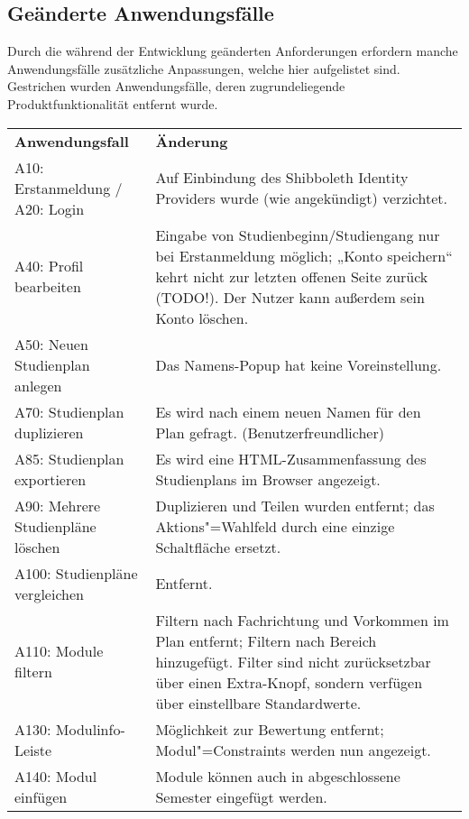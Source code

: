 \FloatBarrier
\subsection{Geänderte Anwendungsfälle}

Durch die während der Entwicklung geänderten Anforderungen erfordern manche Anwendungsfälle zusätzliche Anpassungen, welche hier aufgelistet sind. Gestrichen wurden Anwendungsfälle, deren zugrundeliegende Produktfunktionalität entfernt wurde.

\begin{longtable}{| >{\hspace{0pt}} p{} | >{\hspace{0pt}} p{} |}
	\hline
	\textbf{Anwendungsfall} & \textbf{Änderung} \\ 
	\hhline{|=|=|}  
	\endfirsthead
	\endhead
	A10: Erstanmeldung / \newline A20: Login 
	& Auf Einbindung des Shibboleth Identity Providers wurde (wie angekündigt) verzichtet. \\
	\hline
	A40: Profil bearbeiten
	& Eingabe von Studienbeginn/Studiengang nur bei Erstanmeldung möglich; „Konto speichern“ kehrt nicht zur letzten offenen Seite zurück (TODO!). Der Nutzer kann außerdem sein Konto löschen. \\
	\hline
	A50: Neuen Studienplan anlegen
	& Das Namens-Popup hat keine Voreinstellung. \\
	\hline
	A70: Studienplan duplizieren
	& Es wird nach einem neuen Namen für den Plan gefragt. (Benutzerfreundlicher) \\
	\hline
	A85: Studienplan exportieren
	& Es wird eine HTML-Zusammenfassung des Studienplans im Browser angezeigt. \\
	\hline
	A90: Mehrere Studienpläne löschen
	& Duplizieren und Teilen wurden entfernt; das Aktions"=Wahlfeld durch eine einzige Schaltfläche ersetzt. \\ 
	\hline
	A100: Studienpläne vergleichen
	& Entfernt. \\
	\hline
	A110: Module filtern
	& Filtern nach Fachrichtung und Vorkommen im Plan entfernt; Filtern nach Bereich hinzugefügt. Filter sind nicht zurücksetzbar über einen Extra-Knopf, sondern verfügen über einstellbare Standardwerte.\\
	\hline
	A130: Modulinfo-Leiste
	& Möglichkeit zur Bewertung entfernt; Modul"=Constraints werden nun angezeigt. \\
	\hline
	A140: Modul einfügen
	& Module können auch in abgeschlossene Semester eingefügt werden. \\

\end{longtable}
